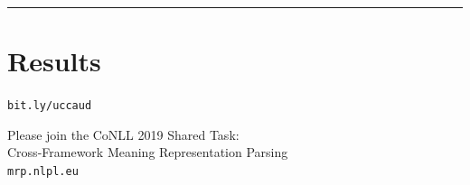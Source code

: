 \documentclass[extrafontsizes,60pt,twocolumn]{memoir}
\begin{document}
\vfill
\hrule


\section*{Results}


\begin{center}
\LARGE\texttt{bit.ly/{\color{blue}ucca}{\color{red}ud}}
\end{center}

\begin{minipage}{.4\columnwidth}
\color{DarkSlateGray}
\tiny
\setlength\bibitemsep{0pt}


\end{minipage}
\hspace{1in}
\begin{minipage}{.475\columnwidth}
\color{Black}
\begin{adjustbox}{margin=3mm,frame,minipage=1.15\columnwidth}
\centering\Large
Please join the CoNLL 2019 Shared Task: \\
Cross-Framework Meaning Representation Parsing \\
\Large\texttt{{\color{violet}mrp}.{\color{red}nlpl}.{\color{blue}eu}}
\end{adjustbox}
\end{minipage}
\end{document}
